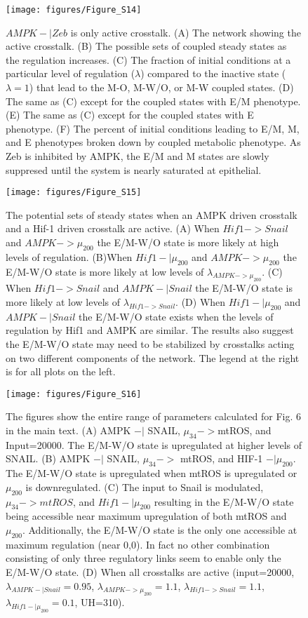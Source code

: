 \documentclass{article}
\begin{document}
\begin{figure}
\texttt{[image: figures/Figure\_S14]}
\caption{$AMPK -| Zeb$ is only active crosstalk. (A) The network showing the active crosstalk. (B) The possible sets of coupled steady states as the regulation increases. (C) The fraction of initial conditions at a particular level of regulation ($\lambda$) compared to the inactive state ($\lambda=1$) that lead to the M-O, M-W/O, or M-W coupled states. (D) The same as (C) except for the coupled states with E/M phenotype. (E) The same as (C) except for the coupled states with E phenotype. (F) The percent of initial conditions leading to E/M, M, and E phenotypes broken down by coupled metabolic phenotype. As Zeb is inhibited by AMPK, the E/M and M states are slowly suppresed until the system is nearly saturated at epithelial. }
\end{figure}

\begin{figure}
\texttt{[image: figures/Figure\_S15]}
\caption{The potential sets of steady states when an AMPK driven crosstalk and a Hif-1 driven crosstalk are active. (A) When $Hif1 -> Snail$ and $AMPK -> \mu_{200}$ the E/M-W/O state is more likely at high levels of regulation. (B)When $Hif1 -| \mu_{200}$ and $AMPK -> \mu_{200}$ the E/M-W/O state is more likely at low levels of $\lambda_{AMPK->\mu_{200}}$. (C) When $Hif1 -> Snail$ and $AMPK -| Snail$ the E/M-W/O state is more likely at low  levels of $\lambda_{Hif1-> Snail}$. (D) When $Hif1 -| \mu_{200}$ and $AMPK -| Snail$ the E/M-W/O state exists when the levels of regulation by Hif1 and AMPK are similar. The results also suggest the E/M-W/O state may need to be stabilized by crosstalks acting on two different components of the network.  The legend at the right is for all plots on the left. }

\end{figure}


\begin{figure}
\texttt{[image: figures/Figure\_S16]}
\caption{The figures show the entire range of parameters calculated for Fig. 6 in the main text.  (A) AMPK $-|$ SNAIL, $\mu_{34}->$mtROS, and Input=20000. The E/M-W/O state is upregulated at higher levels of SNAIL.  (B) AMPK $-|$ SNAIL, $\mu_{34}->$ mtROS, and HIF-1 $-|\mu_{200}$. The E/M-W/O state is upregulated when mtROS is upregulated or $\mu_{200}$ is downregulated. (C) The input to Snail is modulated, $\mu_{34}->mtROS$, and $Hif1-|\mu_{200}$ resulting in the E/M-W/O state being accessible near maximum upregulation of both mtROS and $\mu_{200}$. Additionally, the E/M-W/O state is the only one accessible at maximum regulation (near 0,0). In fact no other combination consisting of only three regulatory links seem to enable only the E/M-W/O state. (D) When all crosstalks are active (input=20000, $\lambda_{AMPK-|Snail} = 0.95$, $\lambda_{AMPK->\mu_{200}} =1.1$, $\lambda_{Hif1->Snail} = 1.1$,   $\lambda_{Hif1-|\mu_{200}} = 0.1$, UH=310).}
\end{figure}
\end{document}
